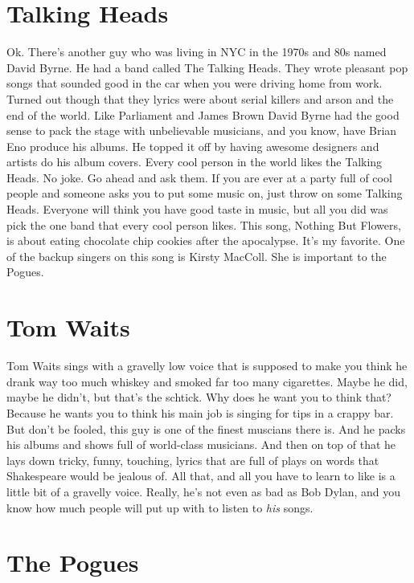 \documentclass[letterpaper,12pt,single]{article}
\begin{document}
\section{Talking Heads}

Ok. There's another guy who was living in NYC in the 1970s and 80s named David Byrne. He had a band called The Talking Heads. They wrote pleasant pop songs that sounded good in the car when you were driving home from work. Turned out though that they lyrics were about serial killers and arson and the end of the world. Like Parliament and James Brown David Byrne had the good sense to pack the stage with unbelievable musicians, and you know, have Brian Eno produce his albums. He topped it off by having awesome designers and artists do his album covers. Every cool person in the world likes the Talking Heads. No joke. Go ahead and ask them. If you are ever at a party full of cool people and someone asks you to put some music on, just throw on some Talking Heads. Everyone will think you have good taste in music, but all you did was pick the one band that every cool person likes. This song, Nothing But Flowers, is about eating chocolate chip cookies after the apocalypse. It's my favorite. One of the backup singers on this song is Kirsty MacColl. She is important to the Pogues.

\section{Tom Waits}

Tom Waits sings with a gravelly low voice that is supposed to make you think he drank way too much whiskey and smoked far too many cigarettes. Maybe he did, maybe he didn't, but that's the schtick. Why does he want you to think that? Because he wants you to think his main job is singing for tips in a crappy bar. But don't be fooled, this guy is one of the finest muscians there is. And he packs his albums and shows full of world-class musicians. And then on top of that he lays down tricky, funny, touching, lyrics that are full of plays on words that Shakespeare would be jealous of. All that, and all you have to learn to like is a little bit of a gravelly voice. Really, he's not even as bad as Bob Dylan, and you know how much people will put up with to listen to \emph{his} songs.

\section{The Pogues}
\end{document}
